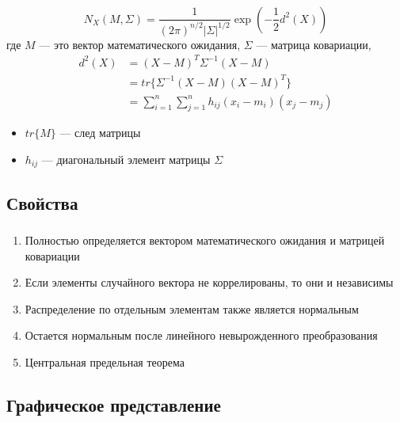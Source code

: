 \documentclass{beamer}
\begin{document}
\begin{frame}
  \frametitle{\insertsection}
  \framesubtitle{\insertsubsection}
  
  \begin{equation*}
    N_X(M, \Sigma) = \frac{1}{(2 \pi )^{n/2} | \Sigma |^{1/2} }
    \exp(-\frac{1}{2} d^2(X))
  \end{equation*}
  где $M$ --- это вектор математического ожидания, $\Sigma$ --- матрица ковариации, \pause
  \begin{align*}
    d^2(X) &= (X - M)^T \Sigma^{-1} (X - M)\\
           &= tr\{\Sigma^{-1} (X - M)(X - M)^T\}\\
           &=\sum_{i = 1}^{n}\sum_{j = 1}^{n} h_{ij}(x_i - m_i)(x_j - m_j)
  \end{align*}

  \begin{itemize}
    \item $tr\{M\}$ --- след матрицы
    \item $h_{ij}$ --- диагональный элемент матрицы $\Sigma$
  \end{itemize}


\end{frame}

\subsection{Свойства}

\begin{frame}
  \frametitle{\insertsection}
  \framesubtitle{\insertsubsection}

  \begin{enumerate}
    \item Полностью определяется вектором математического ожидания и матрицей ковариации \pause
    \item Если элементы случайного вектора не коррелированы, то они и независимы \pause
    \item Распределение по отдельным элементам также является нормальным \pause
    \item Остается нормальным после линейного невырожденного преобразования \pause
    \item Центральная предельная теорема
  \end{enumerate}

\end{frame}

\subsection{Графическое представление}
\end{document}
